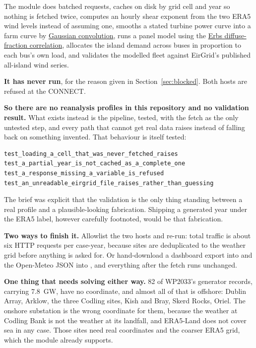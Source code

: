 \documentclass[11pt,a4paper]{article}
\begin{document}
The module does batched requests, caches on disk by grid cell and year so
nothing is fetched twice, computes an hourly shear exponent from the two ERA5
wind levels instead of assuming one, smooths a stated turbine power curve into
a farm curve by \href{https://doi.org/10.1016/j.energy.2016.08.068}{Gaussian convolution}, runs a panel model using the
\href{https://doi.org/10.1016/0038-092X(82)90302-4}{Erbs diffuse-fraction correlation}, allocates
the island demand across buses in proportion to each bus's own load, and
validates the modelled fleet against EirGrid's published all-island wind
series.

\textbf{It has never run}, for the reason given in Section~\ref{sec:blocked}.
Both hosts are refused at the CONNECT.

\textbf{So there are no reanalysis profiles in this repository and no
validation result.} What exists instead is the pipeline, tested, with the fetch
as the only untested step, and every path that cannot get real data raises
instead of falling back on something invented. That behaviour is itself
tested:

\begin{lstlisting}
test_loading_a_cell_that_was_never_fetched_raises
test_a_partial_year_is_not_cached_as_a_complete_one
test_a_response_missing_a_variable_is_refused
test_an_unreadable_eirgrid_file_raises_rather_than_guessing
\end{lstlisting}

The brief was explicit that the validation is the only thing standing between a
real profile and a plausible-looking fabrication. Shipping a generated year
under the ERA5 label, however carefully footnoted, would be that fabrication.

\textbf{Two ways to finish it.} Allowlist the two hosts and re-run: total
traffic is about six HTTP requests per case-year, because sites are
deduplicated to the weather grid before anything is asked for. Or hand-download
a dashboard export into  and the Open-Meteo JSON into
, and everything after the fetch runs unchanged.

\textbf{One thing that needs solving either way.} 82 of WP2033's generator
records, carrying 7.8~GW, have no coordinate, and almost all of that is
offshore: Dublin Array, Arklow, the three Codling sites, Kish and Bray, Skerd
Rocks, Oriel. The onshore substation is the wrong coordinate for them, because
the weather at Codling Bank is not the weather at its landfall, and ERA5-Land
does not cover sea in any case. Those sites need real coordinates and the
coarser ERA5 grid, which the module already supports.
\end{document}
